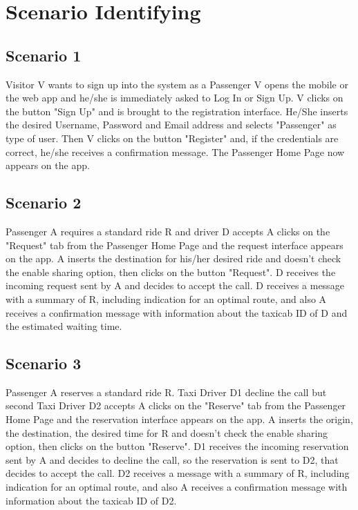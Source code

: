\chapter{Scenario Identifying} \label{chap4}

\section{Scenario 1}
Visitor V wants to sign up into the system as a Passenger V opens the mobile or the web app and he/she is immediately asked to Log In or Sign Up. V clicks on the button "Sign Up" and is brought to the registration interface. He/She inserts the desired Username, Password and Email address and selects "Passenger" as type of user. Then V clicks on the button "Register" and, if the credentials are correct, he/she receives a confirmation message. The Passenger Home Page now appears on the app.

\section{Scenario 2}
Passenger A requires a standard ride R and driver D accepts A clicks on the "Request" tab from the Passenger Home Page and the request interface appears on the app. A inserts the destination for his/her desired ride and doesn't check the enable sharing option, then clicks on the button "Request". D receives the incoming request sent by A and decides to accept the call. D receives a message with a summary of R, including indication for an optimal route, and also A receives a confirmation message with information about the taxicab ID of D and the estimated waiting time. 

\section{Scenario 3}
Passenger A reserves a standard ride R. Taxi Driver D1 decline the call but second Taxi Driver D2 accepts
A clicks on the "Reserve" tab from the Passenger Home Page and the reservation interface appears on the app. A inserts the origin, the destination, the desired time for R and doesn't check the enable sharing option, then clicks on the button "Reserve". D1 receives the incoming reservation sent by A and decides to decline the call, so the reservation is sent to D2, that decides to accept the call. D2 receives a message with a summary of R, including indication for an optimal route, and also A receives a confirmation message with information about the taxicab ID of D2.

